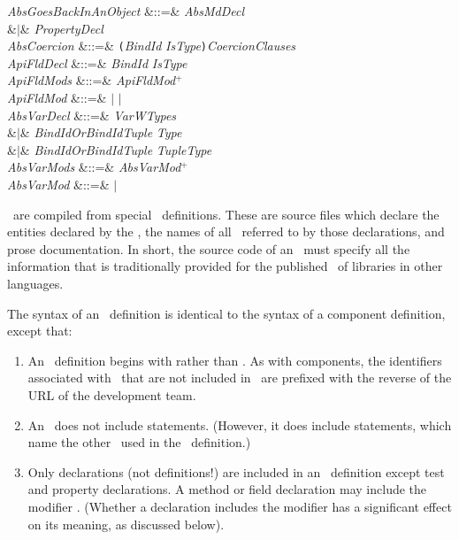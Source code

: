 \begin{GrammarTwo}
\emph{AbsGoesBackInAnObject}
&::=& \emph{AbsMdDecl} \\
&$|$& \emph{PropertyDecl} \\

\emph{AbsCoercion} &::=&
\texttt(\emph{BindId} \emph{IsType}\texttt)\emph{CoercionClauses} \\

\emph{ApiFldDecl} &::=& 
\emph{BindId} \emph{IsType}\\

\emph{ApiFldMods} &::=& \emph{ApiFldMod}$^+$\\

\emph{ApiFldMod} &::=&  $|$  $|$ \\

\emph{AbsVarDecl} &::=&  \emph{VarWTypes}\\
&$|$&  \emph{BindIdOrBindIdTuple} \EXP{\mathrel{\mathtt{:}}} \emph{Type}\\
&$|$&  \emph{BindIdOrBindIdTuple} \EXP{\mathrel{\mathtt{:}}} \emph{TupleType}\\

\emph{AbsVarMods} &::=& \emph{AbsVarMod}$^+$\\

\emph{AbsVarMod} &::=&  $|$ \\

\end{GrammarTwo}


\Apis\ are compiled from special \apiN\ definitions.  These are source
files which declare the entities declared by the \apiN, the names of all
\apisN\ referred to by those declarations, and prose documentation.  In
short, the source code of an \apiN\ must specify all the information
that is traditionally provided for the published \apisN\ of libraries in
other languages.

The syntax of an \apiN\ definition is
identical to the syntax of a component definition, except that:
\begin{enumerate}

\item
An \apiN\ definition begins with 
rather than .
As with components,
the identifiers associated with \apisN\ that are not included in \library\
are prefixed with the reverse of the URL of the development team.

\item
An \apiN\ does not include  statements.
(However, it does include  statements,
which name the other \apisN\ used in the \apiN\ definition.)

\item
Only declarations (not definitions!) are included in an \apiN\
definition except test and property declarations.
A method or field declaration may include the modifier .
(Whether a declaration includes the modifier 
has a significant effect on its meaning, as discussed below).

\end{enumerate}


